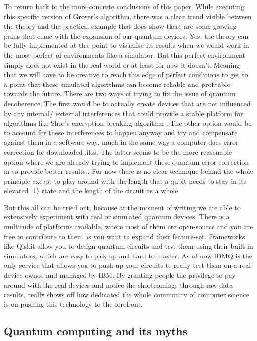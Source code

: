 To return back to the more concrete conclusions of this paper. While executing this specific version of Grover's algorithm, there was a clear trend visible between the theory and the practical example that does show there are some growing pains that come with the expansion of our quantum devices.
Yes, the theory can be fully implemented at this point to visualise its results when we would work in the most perfect of environments like a simulator. But this perfect environment simply does not exist in the real world or at least for now it doesn't. Meaning that we will have to be creative to reach this edge of perfect conditions to get to a point that these simulated algorithms can become reliable and profitable towards the future. There are two ways of trying to fix the issue of quantum decoherence. The first would be to actually create devices that are not influenced by any internal/ external interferences that could provide a stable platform for algorithms like Shor's encryption breaking algorithm \textcite{gidney2019factor}. The other option would be to account for these interferences to happen anyway and try and compensate against them in a software way, much in the same way a computer does error correction for downloaded files. The latter seems to be the more reasonable option where we are already trying to implement these quantum error correction in to provide better results \autocite{Cory1998}. For now there is no clear technique behind the whole principle except to play around with the length that a qubit needs to stay in its elevated $\ket{1}$ state and the length of the circuit as a whole

But this all can be tried out, because at the moment of writing we are able to extensively experiment with real or simulated quantum devices. There is a multitude of platforms available, where most of them are open-source and you are free to contribute to them as you want to expand their feature-set. Frameworks like Qiskit allow you to design quantum circuits and test them using their built in simulators, which are easy to pick up and hard to master. As of now IBMQ is the only service that allows you to push up your circuits to really test them on a real device owned and managed by IBM. By granting people the privilege to pay around with the real devices and notice the shortcomings through raw data results, really shows off how dedicated the whole community of computer science is on pushing this technology to the forefront.


\subsection{Quantum computing and its myths}

